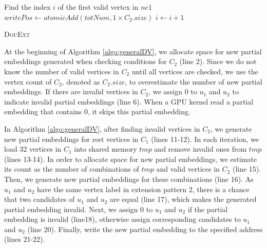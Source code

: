 \begin{algorithm}
	Find the index $i$ of the first valid vertex in $ne1$\;
	$writePos \leftarrow atomicAdd(totNum,1 \times C_{2}.size)$\;
	$i \leftarrow i+1$\;
	\caption{\textsc{DouExt}}
	\label{algo:generalDV}
\end{algorithm}

At the beginning of Algorithm \ref{algo:generalDV}, we allocate space for new partial embeddings generated when checking conditions for $C_2$ (line 2). Since we do not know the number of valid vertices in $C_2$ until all vertices are checked, we use the vertex count of $C_2$, denoted as $C_{2}.size$, to overestimate the number of new partial embeddings. If there are invalid vertices in $C_2$, we assign 0 to $u_1$ and $u_2$ to indicate invalid partial embeddings (line 6). When a GPU kernel read a partial embedding that contains 0, it skips this partial embedding.

In Algorithm \ref{algo:generalDV}, after finding invalid vertices in $C_2$, we generate new partial embeddings for rest vertices in $C_1$ (lines 11-12). In each iteration, we load 32 vertices in $C_1$ into shared memory $tmp$ and remove invalid ones from $tmp$ (lines 13-14). In order to allocate space for new partial embeddings, we estimate its count as the number of combinations of $tmp$ and valid vertices in $C_2$ (line 15). Then, we generate new partial embeddings for these combinations (line 16). As $u_1$ and $u_2$ have the same vertex label in extension pattern 2, there is a chance that two candidates of $u_1$ and $u_2$ are equal (line 17), which makes the generated partial embedding invalid. Next, we assign 0 to $u_1$ and $u_2$ if the partial embedding is invalid (line18), otherwise assign corresponding candidates to $u_1$ and $u_2$ (line 20). Finally, write the new partial embedding to the specified address (lines 21-22).

